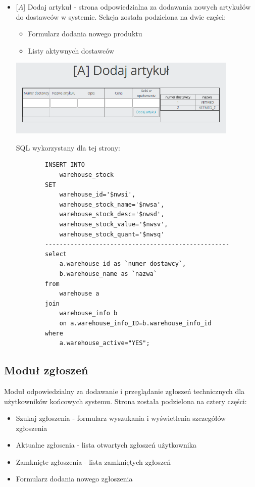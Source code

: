 \documentclass[10pt,a4paper]{article}
\begin{document}
\begin{itemize}
\begin{lstlisting}
		
		\end{lstlisting}
		\newpage
		
		\item $[A$] Dodaj artykuł - strona odpowiedzialna za dodawania nowych artykułów do dostawców w systemie. Sekcja została podzielona na dwie części:
		
			\begin{itemize}
				\item Formularz dodania nowego produktu
				\item Listy aktywnych dostawców
			\end{itemize}
		
	\includegraphics[width=11cm]{15}
		
		SQL wykorzystany dla tej strony:
		\begin{lstlisting}
		INSERT INTO 
			warehouse_stock 
		SET 
			warehouse_id='$nwsi', 
			warehouse_stock_name='$nwsa',  
			warehouse_stock_desc='$nwsd', 
			warehouse_stock_value='$nwsv', 
			warehouse_stock_quant='$nwsq' 
		---------------------------------------------------
		select 
			a.warehouse_id as `numer dostawcy`,
			b.warehouse_name as `nazwa`
		from 
			warehouse a 
		join 
			warehouse_info b 
			on a.warehouse_info_ID=b.warehouse_info_id 
		where 
			a.warehouse_active="YES";
		\end{lstlisting}
		
	\end{itemize}

\subsection{Moduł zgłoszeń}
	Moduł odpowiedzialny za dodawanie i przeglądanie zgłoszeń technicznych dla użytkowników końcowych systemu. Strona została podzielona na cztery części:
	\begin{itemize}
		\item Szukaj zgłoszenia - formularz wyszukania i wyświetlenia szczegółów zgłoszenia
		\item Aktualne zgłosenia - lista otwartych zgłoszeń użytkownika
		\item Zamknięte zgłoszenia - lista zamkniętych zgłoszeń
		\item Formularz dodania nowego zgłoszenia
	\end{itemize}
\end{document}
